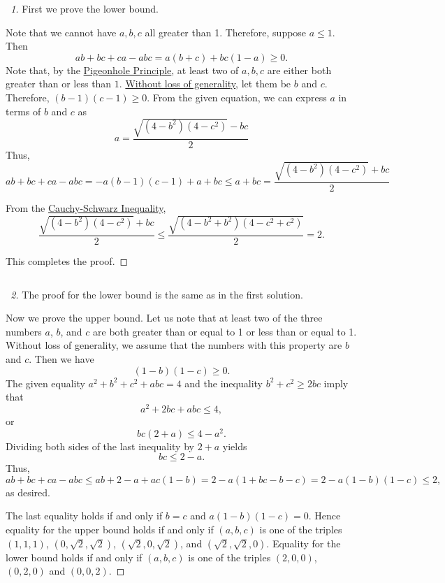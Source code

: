 \documentclass[12pt]{article}
\begin{document}
\begin{proof}[\proofname\ 1]
First we prove the lower bound.

Note that we cannot have $a, b, c$ all greater than 1.
Therefore, suppose $a \le 1$.
Then
$$ab + bc + ca - abc = a(b + c) + bc(1-a) \ge 0.$$
Note that, by the \href{https://artofproblemsolving.com/wiki/index.php/Pigeonhole_Principle}{Pigeonhole Principle}, at least two of $a,b,c$ are either both greater than or less than $1$. \href{https://artofproblemsolving.com/wiki/index.php/Without_loss_of_generality}{Without loss of generality}, let them be $b$ and $c$. Therefore, $(b-1)(c-1)\ge 0$. From the given equation, we can express $a$ in terms of $b$ and $c$ as
$$a=\frac{\sqrt{(4-b^2)(4-c^2)}-bc}{2}$$
Thus,
$$ab + bc + ca - abc = -a (b-1)(c-1)+a+bc \le a+bc = \frac{\sqrt{(4-b^2)(4-c^2)} + bc}{2}$$

From the \href{https://artofproblemsolving.com/wiki/index.php/Cauchy-Schwarz_Inequality}{Cauchy-Schwarz Inequality},
$$\frac{\sqrt{(4-b^2)(4-c^2)} + bc}{2} \le \frac{\sqrt{(4-b^2+b^2)(4-c^2+c^2)} }{2} = 2.$$

This completes the proof.
\end{proof}

$$$$

\begin{proof}[\proofname\ 2]
The proof for the lower bound is the same as in the first solution.

Now we prove the upper bound. Let us note that at least two of the three numbers $a$, $b$, and $c$ are both greater than or equal to 1 or less than or equal to 1. Without loss of generality, we assume that the numbers with this property are $b$ and $c$. Then we have
$$(1 - b)(1 - c)\geq 0.$$
The given equality $a^2 + b^2 + c^2 + abc = 4$ and the inequality $b^2 + c^2\geq 2bc$ imply that
$$a^2 + 2bc + abc\leq 4,$$
or
$$bc(2 + a)\leq 4 - a^2.$$
Dividing both sides of the last inequality by $2 + a$ yields
$$bc\leq 2 - a.$$
Thus,
$$ab + bc + ca - abc\leq ab + 2 - a + ac(1 - b) = 2 - a(1 + bc - b - c) = 2 - a(1 - b)(1 - c)\leq 2,$$
as desired.

The last equality holds if and only if $b = c$ and $a(1 - b)(1 - c) = 0$. Hence equality for the upper bound holds if and only if $(a,b,c)$ is one of the triples $(1,1,1)$, $(0,\sqrt{2},\sqrt{2})$, $(\sqrt{2},0,\sqrt{2})$, and $(\sqrt{2},\sqrt{2},0)$. Equality for the lower bound holds if and only if $(a,b,c)$ is one of the triples $(2,0,0)$, $(0,2,0)$ and $(0,0,2)$.
\end{proof}
\end{document}
